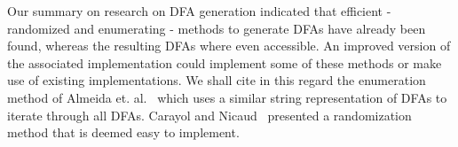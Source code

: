 Our summary on research on DFA generation indicated that efficient - randomized and enumerating - methods to generate DFAs have already been found, whereas the resulting DFAs where even accessible. An improved version of the associated implementation could implement some of these methods or make use of existing implementations. We shall cite in this regard the enumeration method of Almeida et. al.~\cite{AAA09} which uses a similar string representation of DFAs to iterate through all DFAs. Carayol and Nicaud~\cite{CN12} presented a randomization method that is deemed easy to implement.
